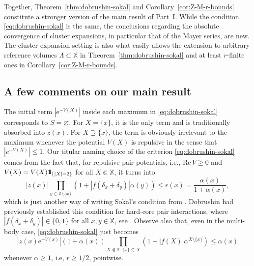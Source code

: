 \documentclass[10pt,a4paper]{amsart}
\newcommand{\e}{\mathrm{e}}
\newcommand{\X}{\mathbb X}
\renewcommand{\Re}{\mathrm{Re}\,}
\def\1{{\mathchoice {1\mskip-4mu\mathrm l}      
{1\mskip-4mu\mathrm l}
{1\mskip-4.5mu\mathrm l} {1\mskip-5mu\mathrm l}}}
\begin{document}
Together, Theorem~\ref{thm:dobrushin-sokal} and Corollary~\ref{cor:Z-M-r-bounds} constitute a stronger version of the main result of Part~I. 
While the condition \eqref{eq:dobrushin-sokal} is the same, the conclusions regarding the absolute convergence of cluster expansions, in particular that of the Mayer series, are new. 
The cluster expansion setting is also what easily allows the extension to arbitrary reference volumes $\Lambda \subset \X$ in Theorem~\ref{thm:dobrushin-sokal} and at least $r$-finite ones in Corollary~\ref{cor:Z-M-r-bounds}.

\subsection{A few comments on our main result}

The initial term $|\e^{-V(X)}|$ inside each maximum in \eqref{eq:dobrushin-sokal} corresponds to $S = \varnothing$. 
For $X = \{x\}$, it is the only term and is traditionally absorbed into $z(x)$. 
For $X \supsetneq \{x\}$, the term is obviously irrelevant to the maximum whenever the potential $V(X)$ is repulsive in the sense that $|e^{-V(X)}| \leq 1$. 
Our titular naming choice of the criterion \eqref{eq:dobrushin-sokal} comes from the fact that, for repulsive pair potentials, i.e., $\Re V \geq 0$ and $V(X) = V(X) \1_{\{|X| = 2\}}$ for all $X \Subset \X$, it turns into
\[
	|z(x)| \prod_{y \in \X \setminus \{x\}} (1 + |f(\delta_x + \delta_y)| \alpha(y)) \leq r(x) = \frac{\alpha(x)}{1 + \alpha(x)},
\]
which is just another way of writing Sokal's condition from \cite{ref:sokal, ref:scott-sokal}. 
Dobrushin had previously established this condition for hard-core pair interactions, where $|f(\delta_x+\delta_y)| \in \{0,1\}$ for all $x, y \in \X$, see \cite{ref:dobrushin-semi-invariants, ref:dobrushin-saint-flour}.
Observe also that, even in the multi-body case, \eqref{eq:dobrushin-sokal} just becomes
\[
	|z(x) \e^{-V(x)}| (1 + \alpha(x)) \prod_{X \Subset \X : \{x\} \subsetneq X} (1 + |f(X)| \alpha^{X \setminus \{x\}}) \leq \alpha(x)
\]
whenever $\alpha \geq 1$, i.e, $r \geq 1/2$, pointwise.
\end{document}
